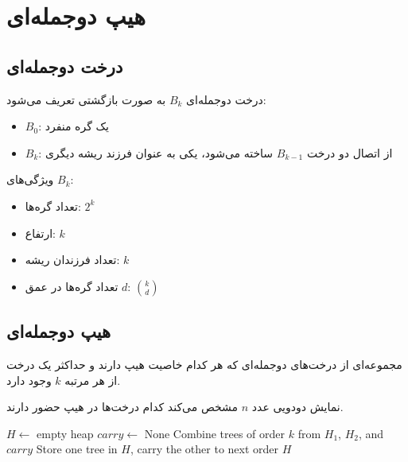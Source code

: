 \documentclass{matinbook}
\begin{document}
    \section{هیپ دوجمله‌ای}
    
    \subsection{درخت دوجمله‌ای}
    
    \begin{definition}
        درخت دوجمله‌ای
        $B_{k}$ به صورت بازگشتی تعریف می‌شود:
        \begin{itemize}
            \item $B_{0}$: یک گره منفرد
            \item $B_{k}$: از اتصال دو درخت $B_{k-1}$
            ساخته می‌شود، یکی به عنوان فرزند ریشه دیگری
        \end{itemize}
        \label{def:binomial-tree}
    \end{definition}
    
    ویژگی‌های $B_{k}$:
    \begin{itemize}
        \item تعداد گره‌ها: $2^{k}$
        \item ارتفاع: $k$
        \item تعداد فرزندان ریشه: $k$
        \item تعداد گره‌ها در عمق $d$: $\binom{k}{d}$
    \end{itemize}
    
    \subsection{هیپ دوجمله‌ای}
    
    \begin{definition}
        مجموعه‌ای از درخت‌های دوجمله‌ای
        که هر کدام خاصیت هیپ دارند و
        حداکثر یک درخت از هر مرتبه $k$ وجود دارد.
        \label{def:binomial-heap}
    \end{definition}
    
    نمایش دودویی عدد $n$ مشخص می‌کند
    کدام درخت‌ها در هیپ حضور دارند.
    
    \begin{latin}
        \begin{algorithm}
            \begin{algorithmic}[1]
                \State $H \gets$ empty heap
                \State $carry \gets$ None
                \State Combine trees of order $k$ from
                $H_{1}$, $H_{2}$, and $carry$
                \State Store one tree in $H$,
                carry the other to next order
                \EndFor
                \State \Return $H$
                \EndFunction
            \end{algorithmic}
        \end{algorithm}
    \end{latin}
    
\end{document}
